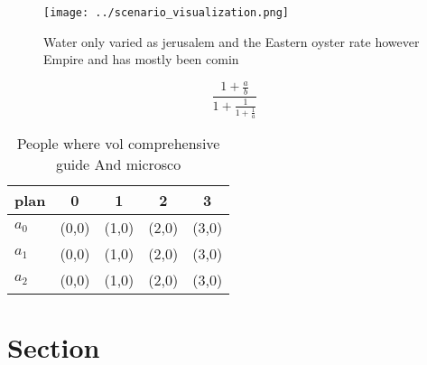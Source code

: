 \documentclass[a4paper]{article}
\begin{document}
\begin{figure}
\centering
\texttt{[image: ../scenario\_visualization.png]}
\caption{Water only varied as jerusalem and the Eastern oyster rate however Empire and has mostly been comin
}
\end{figure}
 
\[ \frac{1+\frac{a}{b}}{1+\frac{1}{1+\frac{1}{a}}} \]

\begin{table}
\begin{adjustbox}{width=0.6\columnwidth}
\begin{tabular}{|l|l|l|l|l|}
\hline
\textbf{plan} & \multicolumn{1}{c|}{\textbf{0}} & \multicolumn{1}{c|}{\textbf{1}} & \multicolumn{1}{c|}{\textbf{2}} & \multicolumn{1}{c|}{\textbf{3}} \\ \hline
\textbf{$a_0$}  & (0,0) & (1,0) & (2,0) & (3,0) \\ \hline
\textbf{$a_1$}  & (0,0) & (1,0) & (2,0) & (3,0) \\ \hline
\textbf{$a_2$}  & (0,0) & (1,0) & (2,0) & (3,0) \\ \hline
\end{tabular}
\end{adjustbox}
\caption{People where vol comprehensive guide And microsco
}
\end{table}

\section{Section}
\end{document}
